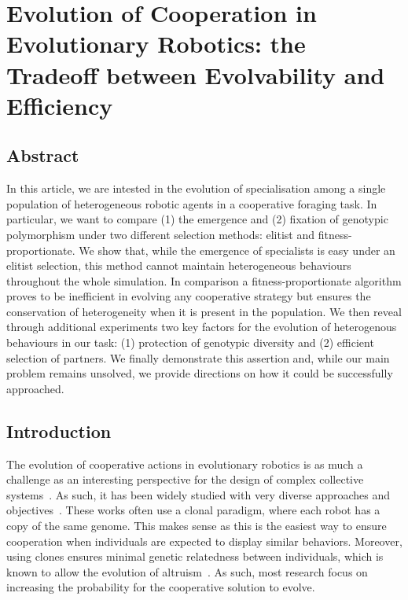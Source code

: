 \clearpage


\chapter{Evolution of Cooperation in Evolutionary Robotics: the Tradeoff between Evolvability and Efficiency}

\section{Abstract}
  In this article, we are intested in the evolution of specialisation among a single population of heterogeneous robotic agents in a cooperative foraging task. In particular, we want to compare (1) the emergence and (2) fixation of genotypic polymorphism under two different selection methods: elitist and fitness-proportionate. We show that, while the emergence of specialists is easy under an elitist selection, this method cannot maintain heterogeneous behaviours throughout the whole simulation. In comparison a fitness-proportionate algorithm proves to be inefficient in evolving any cooperative strategy but ensures the conservation of heterogeneity when it is present in the population. We then reveal through additional experiments two key factors for the evolution of heterogenous behaviours in our task: (1) protection of genotypic diversity and (2) efficient selection of partners. We finally demonstrate this assertion and, while our main problem remains unsolved, we provide directions on how it could be successfully approached.


\section{Introduction}

  The evolution of cooperative actions in evolutionary robotics is as much a challenge as an interesting perspective for the design of complex collective systems~\parencite{Doncieux2015a}. As such, it has been widely studied with very diverse approaches and objectives~\parencite{Waibel2009, Hauert2014, Trianni2007, Lichocki2012}. These works often use a clonal paradigm, where each robot has a copy of the same genome. This makes sense as this is the easiest way to ensure cooperation when individuals are expected to display similar behaviors. Moreover, using clones ensures minimal genetic relatedness between individuals, which is known to allow the evolution of altruism~\parencite{Waibel2011, Montanier2011}. As such, most research focus on increasing the probability for the cooperative solution to evolve.

